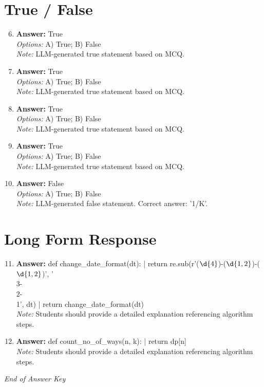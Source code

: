 \documentclass[12pt]{article}
\begin{document}
\section*{True / False}
\begin{enumerate}[label=\arabic*.]
\setcounter{enumi}{5}
\item \textbf{Answer:} True
\\ \textit{Options:} A) True; B) False
\\ \textit{Note:} LLM-generated true statement based on MCQ.
\item \textbf{Answer:} True
\\ \textit{Options:} A) True; B) False
\\ \textit{Note:} LLM-generated true statement based on MCQ.
\item \textbf{Answer:} True
\\ \textit{Options:} A) True; B) False
\\ \textit{Note:} LLM-generated true statement based on MCQ.
\item \textbf{Answer:} True
\\ \textit{Options:} A) True; B) False
\\ \textit{Note:} LLM-generated true statement based on MCQ.
\item \textbf{Answer:} False
\\ \textit{Options:} A) True; B) False
\\ \textit{Note:} LLM-generated false statement. Correct answer: '1/K'.
\end{enumerate}

\section*{Long Form Response}
\begin{enumerate}[label=\arabic*.]
\setcounter{enumi}{10}
\item \textbf{Answer:} def change\_date\_format(dt): | return re.sub(r'(\ensuremath{\d{4}})-(\ensuremath{\d{1,2}})-(\ensuremath{\d{1,2}})', '\\3-\\2-\\1', dt) | return change\_date\_format(dt)
\\ \textit{Note:} Students should provide a detailed explanation referencing algorithm steps.
\item \textbf{Answer:} def count\_no\_of\_ways(n, k): | return dp[n]
\\ \textit{Note:} Students should provide a detailed explanation referencing algorithm steps.
\end{enumerate}

\vfill
\noindent\textit{End of Answer Key}
\end{document}

